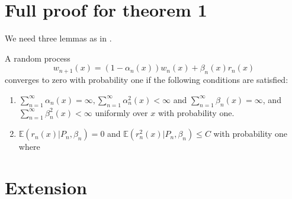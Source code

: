 \section{Full proof for theorem 1}

We need three lemmas as in \cite{jaakkola1993convergence}.

\begin{lemma}
A random process 
$$
w_{n+1}(x) = (1-\alpha_n(x))w_n(x)+\beta_n(x)r_n(x)
$$
converges to zero with probability one if the following conditions are satisfied:
\begin{enumerate}
    \item $\sum_{n=1}^\infty \alpha_n(x) = \infty, \sum_{n=1}^\infty \alpha_n^2(x)<\infty$ and $\sum_{n=1}^\infty \beta_n(x) = \infty$, and $\sum_{n=1}^\infty \beta_n^2(x)<\infty$ uniformly over $x$ with probability one.
    \item $\mathbb{E}(r_n(x)|P_n,\beta_n) = 0$ and $\mathbb{E}(r_n^2(x)|P_n,\beta_n)\le C$ with probability one where
\end{enumerate}
    
\end{lemma}

\section{Extension}
